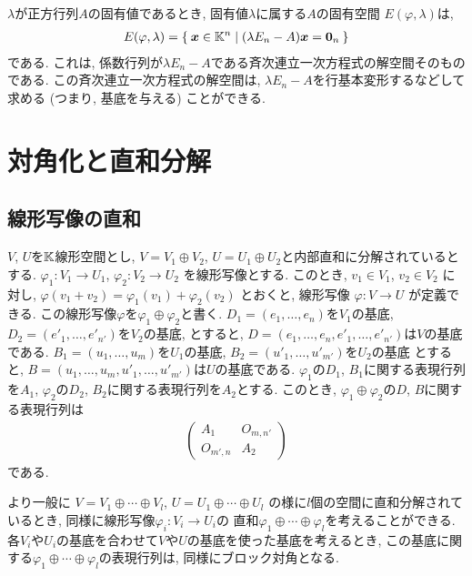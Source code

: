 $\lambda$が正方行列$A$の固有値であるとき,
固有値$\lambda$に属する$A$の固有空間
$E(\varphi,\lambda)$は,
\begin{align*}
    E(\varphi,\lambda) = \Set{\boldsymbol{x}\in\mathbb{K}^n|(\lambda E_n-A)\boldsymbol{x}=\boldsymbol{0}_n}
\end{align*}
である.
これは,
係数行列が$\lambda E_n-A$である斉次連立一次方程式の解空間そのものである.
この斉次連立一次方程式の解空間は,
$\lambda E_n-A$を行基本変形するなどして求める
(つまり, 基底を与える) ことができる.

\begin{quiz}
\end{quiz}



\chapter{対角化と直和分解}
\section{線形写像の直和}
$V$, $U$を$\mathbb{K}$線形空間とし,
$V=V_1\oplus V_2$,
$U=U_1\oplus U_2$と内部直和に分解されているとする.
$\varphi_1\colon V_1\to U_1$,
$\varphi_2\colon V_2\to U_2$
を線形写像とする.
このとき,
$v_1\in V_1$, $v_2\in V_2$
に対し,
$\varphi(v_1+v_2)=\varphi_1(v_1)+\varphi_2(v_2)$
とおくと,
線形写像
$\varphi\colon V\to U$
が定義できる.
この線形写像$\varphi$を$\varphi_1\oplus \varphi_2$と書く.
$D_1=(e_1,\ldots,e_n)$を$V_1$の基底,
$D_2=(e'_1,\ldots,e'_{n'})$を$V_2$の基底,
とすると,
$D=(e_1,\ldots,e_n,e'_1,\ldots,e'_{n'})$は$V$の基底である.
$B_1=(u_1,\ldots,u_m)$を$U_1$の基底,
$B_2=(u'_1,\ldots,u'_{m'})$を$U_2$の基底
とすると,
$B=(u_1,\ldots,u_m,u'_1,\ldots,u'_{m'})$は$U$の基底である.
$\varphi_1$の$D_1$, $B_1$に関する表現行列を$A_1$,
$\varphi_2$の$D_2$, $B_2$に関する表現行列を$A_2$とする.
このとき,
$\varphi_1\oplus \varphi_2$の$D$, $B$に関する表現行列は
\begin{align*}
  \begin{pmatrix}A_1&O_{m,n'}\\O_{m',n}&A_2\end{pmatrix}
\end{align*}
である.

より一般に
$V=V_1\oplus \cdots \oplus V_l$,
$U=U_1\oplus \cdots \oplus U_l$
の様に$l$個の空間に直和分解されているとき,
同様に線形写像$\varphi_i\colon V_i\to U_i$の
直和$\varphi_1\oplus \cdots \oplus \varphi_l$を考えることができる.
各$V_i$や$U_i$の基底を合わせて$V$や$U$の基底を使った基底を考えるとき,
この基底に関する$\varphi_1\oplus \cdots \oplus \varphi_l$の表現行列は,
同様にブロック対角となる.


